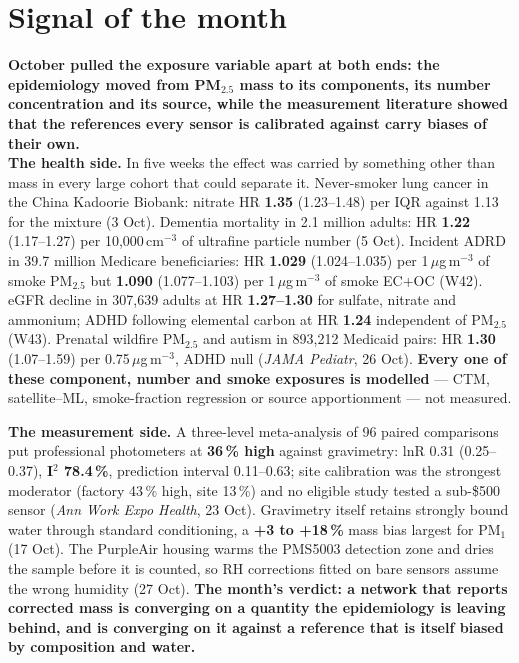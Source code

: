 \documentclass[10pt]{article}
\begin{document}
\vspace{6mm}

\section*{\sffamily\bfseries\color{Deep}Signal of the month}
\vspace{-1.5mm}{\color{Coral}\rule{\linewidth}{1.1pt}}\vspace{2.5mm}

\begin{keybox}
{\sffamily\bfseries\small\color{Deep}October pulled the exposure variable apart at both ends: the
epidemiology moved from PM$_{2.5}$ mass to its components, its number concentration and its source,
while the measurement literature showed that the references every sensor is calibrated against carry
biases of their own.}\\[1.4mm]
\footnotesize
\textbf{The health side.} In five weeks the effect was carried by something other than mass in every large
cohort that could separate it. Never-smoker lung cancer in the China Kadoorie Biobank: nitrate HR
\textbf{1.35} (1.23--1.48) per IQR against 1.13 for the mixture (3 Oct). Dementia mortality in 2.1 million
adults: HR \textbf{1.22} (1.17--1.27) per 10,000\,cm$^{-3}$ of ultrafine particle number (5 Oct). Incident
ADRD in 39.7 million Medicare beneficiaries: HR \textbf{1.029} (1.024--1.035) per 1\,$\mu$g\,m$^{-3}$ of
smoke PM$_{2.5}$ but \textbf{1.090} (1.077--1.103) per 1\,$\mu$g\,m$^{-3}$ of smoke EC+OC (W42). eGFR decline in
307,639 adults at HR \textbf{1.27--1.30} for sulfate, nitrate and ammonium; ADHD following elemental carbon
at HR \textbf{1.24} independent of PM$_{2.5}$ (W43). Prenatal wildfire PM$_{2.5}$ and autism in 893,212
Medicaid pairs: HR \textbf{1.30} (1.07--1.59) per 0.75\,$\mu$g\,m$^{-3}$, ADHD null (\textit{JAMA Pediatr},
26 Oct). \textbf{Every one of these component, number and smoke exposures is modelled} --- CTM,
satellite--ML, smoke-fraction regression or source apportionment --- not measured.

\vspace{1mm}
\textbf{The measurement side.} A three-level meta-analysis of 96 paired comparisons put professional
photometers at \textbf{36\,\% high} against gravimetry: lnR 0.31 (0.25--0.37), \textbf{I$^2$ 78.4\,\%},
prediction interval 0.11--0.63; site calibration was the strongest moderator (factory 43\,\% high, site
13\,\%) and no eligible study tested a sub-\$500 sensor (\textit{Ann Work Expo Health}, 23 Oct).
Gravimetry itself retains strongly bound water through standard conditioning, a \textbf{+3 to +18\,\%}
mass bias largest for PM$_1$ (17 Oct). The PurpleAir housing warms the PMS5003 detection zone and dries
the sample before it is counted, so RH corrections fitted on bare sensors assume the wrong humidity (27 Oct).
\textbf{The month's verdict: a network that reports corrected mass is converging on a quantity the
epidemiology is leaving behind, and is converging on it against a reference that is itself biased by
composition and water.}
\end{keybox}
\end{document}
